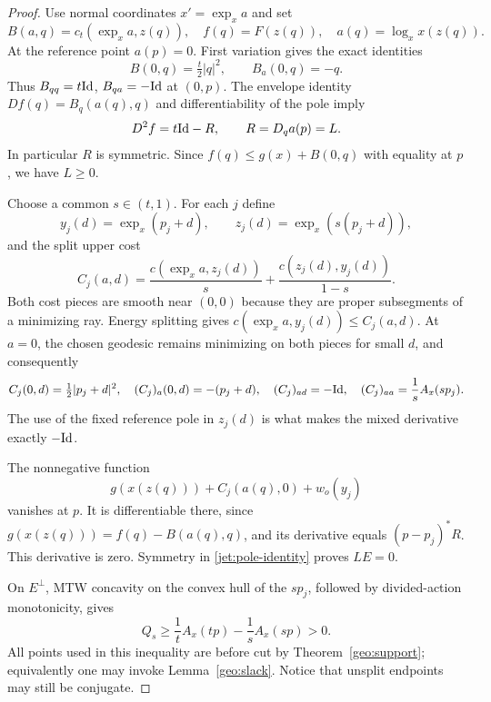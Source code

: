 \begin{proof}
Use normal coordinates $x'=\exp_xa$ and set
\[
 B(a,q)=c_t(\exp_xa,z(q)),\quad
 f(q)=F(z(q)),\quad a(q)=\log_xx(z(q)).
\]
At the reference point $a(p)=0$. First variation gives the exact
identities
\[
 B(0,q)=\tfrac t2|q|^2,\qquad B_a(0,q)=-q.
\]
Thus $B_{qq}=t\mathrm{Id}$, $B_{qa}=-\mathrm{Id}$ at $(0,p)$.
The envelope identity $Df(q)=B_q(a(q),q)$ and differentiability of the
pole imply
\begin{equation}\label{jet:pole-identity}
 D^2f=t\mathrm{Id}-R,\qquad R=D_qa(p)=L.
\end{equation}
In particular $R$ is symmetric. Since
$f(q)\le g(x)+B(0,q)$ with equality at $p$, we have $L\ge0$.

Choose a common $s\in(t,1)$. For each $j$ define
\[
 y_j(d)=\exp_x(p_j+d),\qquad
 z_j(d)=\exp_x(s(p_j+d)),
\]
and the split upper cost
\begin{equation}\label{jet:split-cost}
 C_j(a,d)=
 \frac{c(\exp_xa,z_j(d))}{s}
 +\frac{c(z_j(d),y_j(d))}{1-s}.
\end{equation}
Both cost pieces are smooth near $(0,0)$ because they are proper
subsegments of a minimizing ray. Energy splitting gives
$c(\exp_xa,y_j(d))\le C_j(a,d)$. At $a=0$, the chosen geodesic
remains minimizing on both pieces for small $d$, and consequently
\begin{equation}\label{jet:split-derivatives}
 C_j(0,d)=\tfrac12|p_j+d|^2,\quad
 (C_j)_a(0,d)=-(p_j+d),\quad
 (C_j)_{ad}=-\mathrm{Id},\quad
 (C_j)_{aa}=\frac1sA_x(sp_j).
\end{equation}
The use of the fixed reference pole in $z_j(d)$ is what makes the
mixed derivative exactly $-\mathrm{Id}$.

The nonnegative function
\[
 g(x(z(q)))+C_j(a(q),0)+w_o(y_j)
\]
vanishes at $p$. It is differentiable there, since
$g(x(z(q)))=f(q)-B(a(q),q)$, and its derivative equals
$(p-p_j)^*R$. This derivative is zero. Symmetry in
\eqref{jet:pole-identity} proves $LE=0$.

On $E^\perp$, MTW concavity on the convex hull of the $sp_j$, followed
by divided-action monotonicity, gives
\[
 Q_s\ge \frac1tA_x(tp)-\frac1s A_x(sp)>0.
\]
All points used in this inequality are before cut by
Theorem~\ref{geo:support}; equivalently one may invoke
Lemma~\ref{geo:slack}. Notice that unsplit endpoints may still be
conjugate.


\end{proof}
